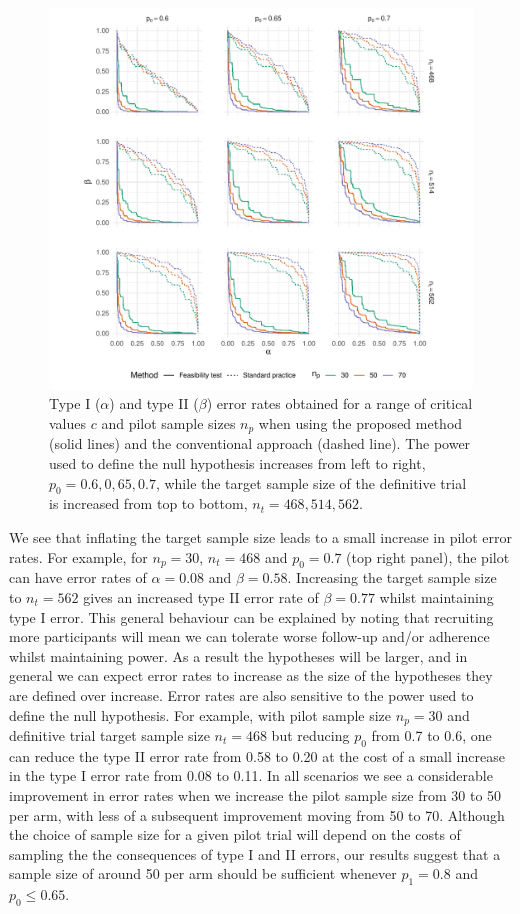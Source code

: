 \documentclass[AMA,STIX1COL]{WileyNJD-v2}
\begin{document}
\begin{figure}
\centering
\includegraphics[scale=0.8, trim={1.5cm 0 0 0},clip]{./Figures/eval.pdf}
\caption{Type I ($\alpha$) and type II ($\beta$) error rates obtained for a range of critical values $c$ and pilot sample sizes $n_p$ when using the proposed method (solid lines) and the conventional approach (dashed line). The power used to define the null hypothesis increases from left to right, $p_0 = 0.6, 0,65, 0.7$, while the target sample size of the definitive trial is increased from top to bottom, $n_t = 468, 514, 562$.}
\label{fig:eval}
\end{figure}
 
We see that inflating the target sample size leads to a small increase in pilot error rates. For example, for $n_p = 30$, $n_t = 468$ and $p_0 = 0.7$ (top right panel), the pilot can have error rates of $\alpha = 0.08$ and $\beta = 0.58$. Increasing the target sample size to $n_t = 562$ gives an increased type II error rate of $\beta = 0.77$ whilst maintaining type I error. This general behaviour can be explained by noting that recruiting more participants will mean we can tolerate worse follow-up and/or adherence whilst maintaining power. As a result the hypotheses will be larger, and in general we can expect error rates to increase as the size of the hypotheses they are defined over increase. Error rates are also sensitive to the power used to define the null hypothesis. For example, with pilot sample size $n_p = 30$ and definitive trial target sample size $n_t = 468$ but reducing $p_0$ from 0.7 to 0.6, one can reduce the type II error rate from 0.58 to 0.20 at the cost of a small increase in the type I error rate from 0.08 to 0.11. In all scenarios we see a considerable improvement in error rates when we increase the pilot sample size from 30 to 50 per arm, with less of a subsequent improvement moving from 50 to 70. Although the choice of sample size for a given pilot trial will depend on the costs of sampling the the consequences of type I and II errors, our results suggest that a sample size of around 50 per arm should be sufficient whenever $p_1 = 0.8$ and $p_0 \leq 0.65$.
\end{document}
